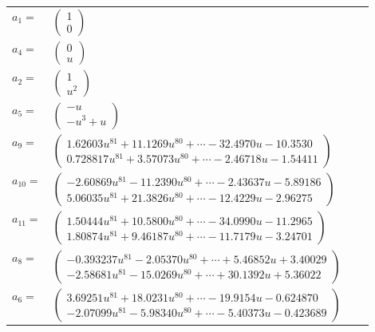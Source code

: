 \documentclass[1p]{elsarticle_modified}
\theoremstyle{definition}
\begin{document}
\begin{tabular}{m{7pt} m{180pt} m{7pt} m{180pt} }
\flushright $a_{1}=$&$\begin{pmatrix}1\\0\end{pmatrix}$ \\
\flushright $a_{4}=$&$\begin{pmatrix}0\\u\end{pmatrix}$ \\
\flushright $a_{2}=$&$\begin{pmatrix}1\\u^2\end{pmatrix}$ \\
\flushright $a_{5}=$&$\begin{pmatrix}- u\\- u^3+u\end{pmatrix}$ \\
\flushright $a_{9}=$&$\begin{pmatrix}1.62603 u^{81}+11.1269 u^{80}+\cdots-32.4970 u-10.3530\\0.728817 u^{81}+3.57073 u^{80}+\cdots-2.46718 u-1.54411\end{pmatrix}$ \\
\flushright $a_{10}=$&$\begin{pmatrix}-2.60869 u^{81}-11.2390 u^{80}+\cdots-2.43637 u-5.89186\\5.06035 u^{81}+21.3826 u^{80}+\cdots-12.4229 u-2.96275\end{pmatrix}$ \\
\flushright $a_{11}=$&$\begin{pmatrix}1.50444 u^{81}+10.5800 u^{80}+\cdots-34.0990 u-11.2965\\1.80874 u^{81}+9.46187 u^{80}+\cdots-11.7179 u-3.24701\end{pmatrix}$ \\
\flushright $a_{8}=$&$\begin{pmatrix}-0.393237 u^{81}-2.05370 u^{80}+\cdots+5.46852 u+3.40029\\-2.58681 u^{81}-15.0269 u^{80}+\cdots+30.1392 u+5.36022\end{pmatrix}$ \\
\flushright $a_{6}=$&$\begin{pmatrix}3.69251 u^{81}+18.0231 u^{80}+\cdots-19.9154 u-0.624870\\-2.07099 u^{81}-5.98340 u^{80}+\cdots-5.40373 u-0.423689\end{pmatrix}$ \\

\end{tabular}
\end{document}
